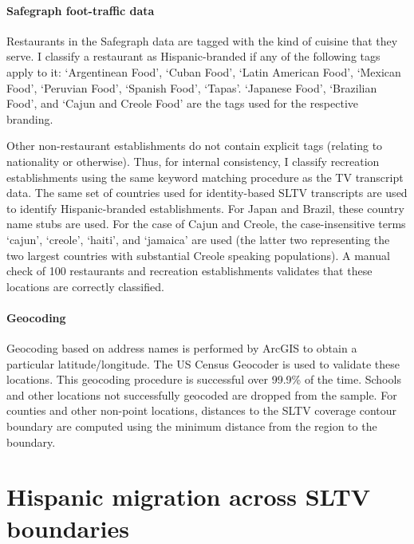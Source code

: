 \documentclass[11pt]{article}
\begin{document}
\paragraph{Safegraph foot-traffic data} 
Restaurants in the Safegraph data are tagged with the kind of cuisine that they serve. I classify a restaurant as Hispanic-branded if any of the following tags apply to it: `Argentinean Food', `Cuban Food', `Latin American Food', `Mexican Food', `Peruvian Food', `Spanish Food', `Tapas'. `Japanese Food', `Brazilian Food', and `Cajun and Creole Food' are the tags used for the respective branding.

Other non-restaurant establishments do not contain explicit tags (relating to nationality or otherwise). Thus, for internal consistency, I classify recreation establishments using the same keyword matching procedure as the TV transcript data. The same set of countries used for identity-based SLTV transcripts are used to identify Hispanic-branded establishments. For Japan and Brazil, these country name stubs are used. For the case of Cajun and Creole, the case-insensitive terms `cajun', `creole', `haiti', and `jamaica' are used (the latter two representing the two largest countries with substantial Creole speaking populations). A manual check of 100 restaurants and recreation establishments validates that these locations are correctly classified.



\paragraph{Geocoding}

Geocoding based on address names is performed by ArcGIS to obtain a particular latitude/longitude. The US Census Geocoder is used to validate these locations. This geocoding procedure is successful over 99.9\% of the time. Schools and other locations not successfully geocoded are dropped from the sample. For counties and other non-point locations, distances to the SLTV coverage contour boundary are computed using the minimum distance from the region to the boundary.


\clearpage

\section{Hispanic migration across SLTV boundaries}\label{a:migration}
\end{document}
